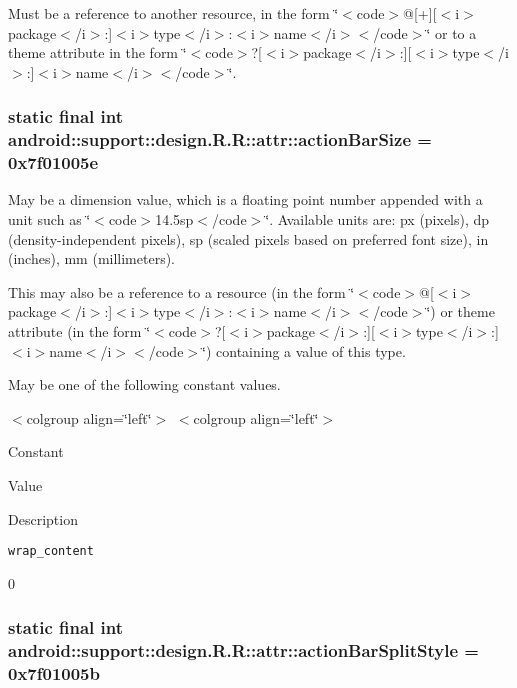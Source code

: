 Must be a reference to another resource, in the form \char`\"{}$<$code$>$@\mbox{[}+\mbox{]}\mbox{[}$<$i$>$package$<$/i$>$:\mbox{]}$<$i$>$type$<$/i$>$:$<$i$>$name$<$/i$>$$<$/code$>$\char`\"{} or to a theme attribute in the form \char`\"{}$<$code$>$?\mbox{[}$<$i$>$package$<$/i$>$:\mbox{]}\mbox{[}$<$i$>$type$<$/i$>$:\mbox{]}$<$i$>$name$<$/i$>$$<$/code$>$\char`\"{}. \hypertarget{classandroid_1_1support_1_1design_1_1_r_1_1attr_17b890be0f14b02e23be641cb07a3345}{
\subsubsection[{actionBarSize}]{\setlength{\rightskip}{0pt plus 5cm}static final int android::support::design.R.R::attr::actionBarSize = 0x7f01005e}}
\label{classandroid_1_1support_1_1design_1_1_r_1_1attr_17b890be0f14b02e23be641cb07a3345}


May be a dimension value, which is a floating point number appended with a unit such as \char`\"{}$<$code$>$14.5sp$<$/code$>$\char`\"{}. Available units are: px (pixels), dp (density-independent pixels), sp (scaled pixels based on preferred font size), in (inches), mm (millimeters). 

This may also be a reference to a resource (in the form \char`\"{}$<$code$>$@\mbox{[}$<$i$>$package$<$/i$>$:\mbox{]}$<$i$>$type$<$/i$>$:$<$i$>$name$<$/i$>$$<$/code$>$\char`\"{}) or theme attribute (in the form \char`\"{}$<$code$>$?\mbox{[}$<$i$>$package$<$/i$>$:\mbox{]}\mbox{[}$<$i$>$type$<$/i$>$:\mbox{]}$<$i$>$name$<$/i$>$$<$/code$>$\char`\"{}) containing a value of this type. 

May be one of the following constant values. \begin{TabularC}{0}
\hline
\end{TabularC}
$<$colgroup align=\char`\"{}left\char`\"{}$>$ $<$colgroup align=\char`\"{}left\char`\"{}$>$ 

Constant

Value

Description 

{\tt wrap\_\-content}

0\hypertarget{classandroid_1_1support_1_1design_1_1_r_1_1attr_62ac575e54df19b6639d84a2226bc971}{
\subsubsection[{actionBarSplitStyle}]{\setlength{\rightskip}{0pt plus 5cm}static final int android::support::design.R.R::attr::actionBarSplitStyle = 0x7f01005b}}
\label{classandroid_1_1support_1_1design_1_1_r_1_1attr_62ac575e54df19b6639d84a2226bc971}



